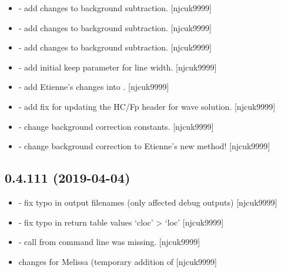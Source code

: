 \documentclass[a4paper,10pt,english]{report}
\begin{document}
\begin{itemize}
\item {} 
 - add changes to background subtraction.
{[}njcuk9999{]}

\item {} 
 - add changes to background subtraction.
{[}njcuk9999{]}

\item {} 
 - add changes to background subtraction.
{[}njcuk9999{]}

\item {} 
 - add initial keep parameter for line width. {[}njcuk9999{]}

\item {} 
 - add Etienne’s changes into
. {[}njcuk9999{]}

\item {} 
 - add fix for updating the HC/Fp header
for wave solution. {[}njcuk9999{]}

\item {} 
 - change background correction constants.
{[}njcuk9999{]}

\item {} 
 - change background correction to Etienne’s
new method! {[}njcuk9999{]}

\end{itemize}


\subsection{0.4.111 (2019-04-04)}
\label{\detokenize{misc/changelog:id149}}\begin{itemize}
\item {} 
 - fix typo in output filenames (only affected
debug outputs) {[}njcuk9999{]}

\item {} 
 - fix typo in return table values ‘cloc’ \textendash{}\textgreater{} ‘loc’
{[}njcuk9999{]}

\item {} 
 - call from command line was missing. {[}njcuk9999{]}

\item {} 
 changes for Melissa (temporary addition of
 {[}njcuk9999{]}

\end{itemize}
\end{document}
